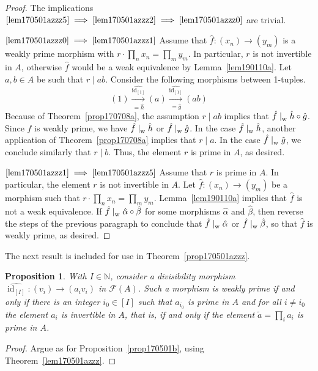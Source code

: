 \documentclass[reqno]{amsart}
\theoremstyle{plain}
\newtheorem{prop}[lem]{Proposition}
\theoremstyle{definition}
\newcommand{\cat}[1]{\mathcal{#1}}
\newcommand{\catf}{\cat{F}}
\newcommand{\id}{\operatorname{id}}
\newcommand{\ti}{\tilde}
\newcommand{\bbn}{\mathbb{N}}
\newcommand{\xra}{\xrightarrow}
\numberwithin{equation}{lem}
\newcommand{\divs}{\mid_{\text w}^{}}
\begin{document}
\begin{proof}
The implications $\eqref{lem170501azzz5}\implies\eqref{lem170501azzz2}\implies\eqref{lem170501azzz0}$
are trivial.


$\eqref{lem170501azzz0}\implies\eqref{lem170501azzz1}$
Assume that
$\hat f\colon (x_n)\to (y_m)$ is a weakly prime morphism with $r\cdot\prod_nx_n=\prod_my_m$.
In particular, $r$ is not invertible in $A$, otherwise 
$\hat f$
would be a weak equivalence by Lemma~\ref{lem190110a}.
Let $a,b\in A$ be such that $r\mid ab$.
Consider the
following morphisms between 1-tuples.
$$(1)\xra[=\hat h]{\widehat{\id_{[1]}}}(a)\xra[=\hat g]{\widehat{\id_{[1]}}}(ab)$$
Because of Theorem~\ref{prop170708a}, the assumption $r\mid ab$
implies that $\hat f\divs\hat h\circ\hat g$.
Since $\hat f$ is 
weakly
prime, we have $\hat f\divs\hat h$ or $\hat f\divs\hat g$.
In the case $\hat f\divs\hat h$, another application of Theorem~\ref{prop170708a} implies that $r\mid a$.
In the case $\hat f\divs\hat g$, we conclude similarly that $r\mid b$.
Thus, the element $r$ is prime in $A$, as desired.

$\eqref{lem170501azzz1}\implies\eqref{lem170501azzz5}$
Assume that $r$ is prime in $A$. In particular, the element $r$ is not invertible in $A$.
Let  $\hat f\colon (x_n)\to (y_m)$ be a morphism such that $r\cdot\prod_nx_n=\prod_my_m$.
Lemma~\ref{lem190110a} implies that $\hat f$ is not a weak equivalence.
If $\hat f\divs\hat \alpha\circ\hat \beta$ for some morphisms $\hat\alpha$ and $\hat\beta$, 
then reverse the steps of the previous paragraph to conclude that $\hat f\divs\hat \alpha$ or $\hat f\divs\hat \beta$,
so that $\hat f$ is weakly prime, as desired.
\end{proof}

The next result is included for use in Theorem~\ref{prop170501azzz}.

\begin{prop}\label{prop170501bzzz}
With $I\in\bbn$, consider a divisibility morphism
$\widehat{\id_{[I]}}\colon(v_i)\to(a_iv_i)$ in $\catf(A)$. 
Such a morphism is 
weakly
prime if and only if there is an integer $i_0\in[I]$ such that
$a_{i_0}$ is prime in $A$ and for all $i\neq i_0$ the element $a_i$ is invertible in $A$, that is, if and only if
the element $\ti a=\prod_ia_i$ is prime in $A$.
\end{prop}

\begin{proof}
Argue as for Proposition~\ref{prop170501b}, using Theorem~\ref{lem170501azzz}.
\end{proof}
\end{document}
